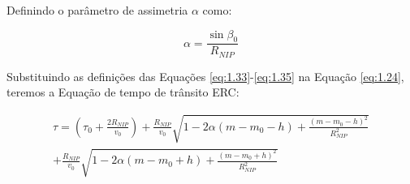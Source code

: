 \documentclass[a4paper, 12pt]{article}
\begin{document}
Definindo o parâmetro de assimetria $\alpha$ como:

\begin{equation}
 \label{eq:1.36}
 \alpha = \frac{\sin \beta_0}{R_{NIP}}
\end{equation}

Substituindo as definições das Equações \ref{eq:1.33}-\ref{eq:1.35} na
Equação \ref{eq:1.24}, teremos a Equação de tempo de trânsito ERC:

\begin{multline}
 \label{eq:1.37}
\tau = \left( \tau_0 + \frac{2 R_{NIP}}{v_0} \right)
+ \frac{R_{NIP}}{v_0} \sqrt{  1 - 2 \alpha (m - m_0 - h) + \frac{(m - m_0 - h)^2}{R_{NIP}^2} } \\
+ \frac{R_{NIP}}{v_0}  \sqrt{  1 - 2 \alpha (m - m_0 + h) + \frac{(m - m_0 + h)^2}{R_{NIP}^2} }
\end{multline}
\end{document}
